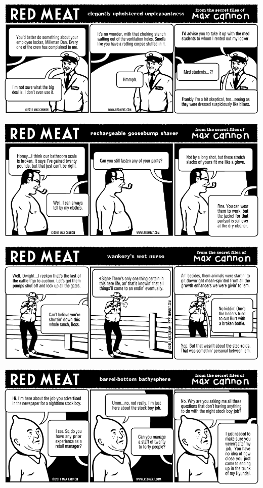 \documentclass[a4paper,twoside,11pt]{article}
\begin{document}
\includegraphics[width=\textwidth]{redmeat_2011-04-05.png}



\includegraphics[width=\textwidth]{redmeat_2011-04-12.png}



\includegraphics[width=\textwidth]{redmeat_2011-04-19.png}



\includegraphics[width=\textwidth]{redmeat_2011-04-26.png}
\end{document}
